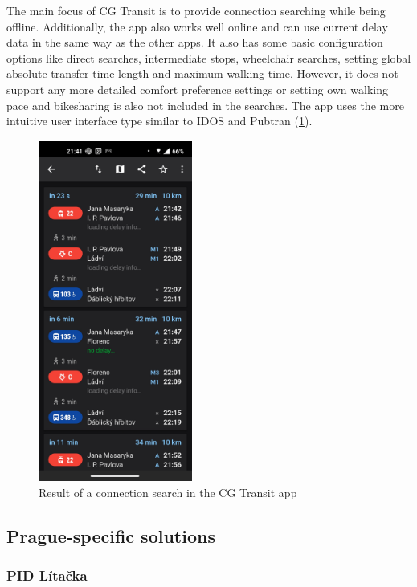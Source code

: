 The main focus of CG Transit is to provide connection searching while being offline. Additionally, the app also works well online and can use current delay data in the same way as the other apps. It also has some basic configuration options like direct searches, intermediate stops, wheelchair searches, setting global absolute transfer time length and maximum walking time. However, it does not support any more detailed comfort preference settings or setting own walking pace and bikesharing is also not included in the searches. The app uses the more intuitive user interface type similar to IDOS and Pubtran (\cref{fig:cg_transit}).


\begin{figure}[h!]
    \centering
    \includegraphics[width=0.45\textwidth]{img/screenshots/cg_transit_result.jpg}
    \caption{Result of a connection search in the CG Transit app}
    \label{fig:cg_transit}
\end{figure}

\subsection{Prague-specific solutions}

\subsubsection{PID Lítačka}


